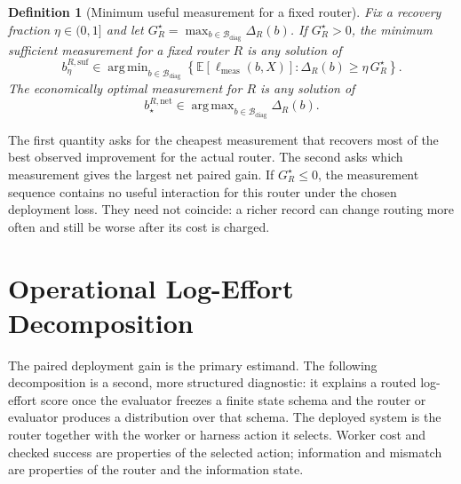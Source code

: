 \documentclass{article}
\newtheorem{definition}{Definition}
\DeclareMathOperator*{\argmin}{arg\,min}
\DeclareMathOperator*{\argmax}{arg\,max}
\newcommand{\cBdiag}{\mathcal{B}_{\mathrm{diag}}}
\newcommand{\E}{\mathbb{E}}
\begin{document}
\begin{definition}[Minimum useful measurement for a fixed router]
\label{def:minimal-useful}
Fix a recovery fraction $\eta\in(0,1]$ and let $G_R^\star=\max_{b\in\cBdiag}\Delta_R(b)$.
If $G_R^\star>0$, the minimum sufficient measurement for a fixed router $R$ is any solution of
\begin{equation}
 b^{R,\mathrm{suf}}_\eta
 \in
 \argmin_{b\in\cBdiag}
 \left\{\E[\ell_{\mathrm{meas}}(b,X)] : \Delta_R(b) \ge \eta\,G_R^\star\right\}.
 \label{eq:min-sufficient}
\end{equation}
The economically optimal measurement for $R$ is any solution of
\begin{equation}
 b^{R,\mathrm{net}}_\star
 \in
 \argmax_{b\in\cBdiag} \Delta_R(b).
 \label{eq:net-optimal}
\end{equation}
\end{definition}

The first quantity asks for the cheapest measurement that recovers most of the best observed improvement for the actual router.
The second asks which measurement gives the largest net paired gain.
If $G_R^\star\le 0$, the measurement sequence contains no useful interaction for this router under the chosen deployment loss.
They need not coincide: a richer record can change routing more often and still be worse after its cost is charged.

\section{Operational Log-Effort Decomposition}
\label{sec:proxies}

The paired deployment gain is the primary estimand.
The following decomposition is a second, more structured diagnostic: it explains a routed log-effort score once the evaluator freezes a finite state schema and the router or evaluator produces a distribution over that schema.
The deployed system is the router together with the worker or harness action it selects.
Worker cost and checked success are properties of the selected action; information and mismatch are properties of the router and the information state.
\end{document}
